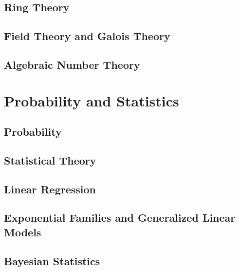 \documentclass[oneside,openany]{book}
\theoremstyle{definition}
\begin{document}
\chapter{Ring Theory}


\chapter{Field Theory and Galois Theory}


\chapter{Algebraic Number Theory}



\part{Probability and Statistics}

\chapter{Probability}


\chapter{Statistical Theory}


\chapter{Linear Regression}


\chapter{Exponential Families and Generalized Linear Models}


\chapter{Bayesian Statistics}

\end{document}
